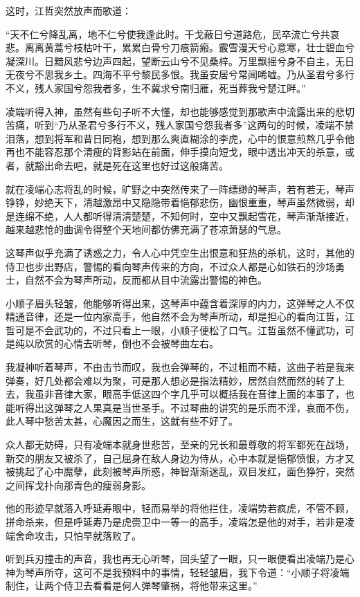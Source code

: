 这时，江哲突然放声而歌道：

“天不仁兮降乱离，地不仁兮使我逢此时。干戈蔽日兮道路危，民卒流亡兮共哀悲。离离黄蒿兮枝枯叶干，累累白骨兮刀痕箭瘢。霰雪漫天兮心意寒，壮士碧血兮凝深川。日黯风悲兮边声四起，望断云山兮不见桑梓。万里飘摇兮身不自主，无日无夜兮不思我乡土。四海不平兮黎民多恨。我虽安居兮常闻唏嘘。乃从圣君兮多行不义，残人家国兮怨我者多，生不冀求兮南归雁，死当葬我兮楚江畔。”

凌端听得入神，虽然有些句子听不大懂，却也能够感觉到那歌声中流露出来的悲切苦痛，听到“乃从圣君兮多行不义，残人家国兮怨我者多”这两句的时候，凌端不禁泪落，想到将军和昔日同袍，想到那么爽直糊涂的李虎，心中的恨意煎熬几乎令他再也不能容忍那个清瘦的背影站在前面，伸手摸向短戈，眼中透出冲天的杀意，或者，就豁出命去吧，就是死在这里也好过这般痛苦。

就在凌端心志将乱的时候，旷野之中突然传来了一阵缥缈的琴声，若有若无，琴声铮铮，妙绝天下，清越激昂中又隐隐带着悒郁悲伤，幽恨重重，琴声虽然微弱，却是连绵不绝，人人都听得清清楚楚，不知何时，空中又飘起雪花，琴声渐渐接近，越来越悲怆的曲调令得整个天地间都仿佛充满了苍凉萧瑟的气息。

这琴声似乎充满了诱惑之力，令人心中凭空生出恨意和狂热的杀机，这时，其他的侍卫也步出野店，警惕的看向琴声传来的方向，不过众人都是心如铁石的沙场勇士，自然不会为琴声所动，反而都从目中流露出警惕的神色。

小顺子眉头轻皱，他能够听得出来，这琴声中蕴含着深厚的内力，这弹琴之人不仅精通音律，还是一位内家高手，他自然不会为琴声所动，却是担心的看向江哲，江哲可是不会武功的，不过只看上一眼，小顺子便松了口气。江哲虽然不懂武功，可是纯以欣赏的心情去听琴，倒也不会被琴曲左右。

我凝神听着琴声，不由击节而叹，我也会弹琴的，不过粗而不精，这曲子若是我来弹奏，好几处都会难以为聚，可是那人想必是指法精妙，居然自然而然的转了上去，我虽非音律大家，眼高手低这四个字几乎可以概括我在音律上面的本事了，也能听得出这弹琴之人果真是当世圣手。不过琴曲的讲究的是乐而不淫，哀而不伤，此人琴中愁苦太甚，心魔因之而生，这就有些不好了。

众人都无妨碍，只有凌端本就身世悲苦，至亲的兄长和最尊敬的将军都死在战场，新交的朋友又被杀了，自己屈身在敌人身边为侍从，心中本就是悒郁愤恨，方才又被挑起了心中魔孽，此刻被琴声所惑，神智渐渐迷乱，双目发红，面色狰狞，突然之间挥戈扑向那青色的瘦弱身影。

他的形迹早就落入呼延寿眼中，轻而易举的将他拦住，凌端势若疯虎，不管不顾，拼命杀来，但是呼延寿乃是虎赍卫中一等一的高手，凌端怎是他的对手，若非是凌端舍命攻击，只怕早就落败了。

听到兵刃撞击的声音，我也再无心听琴，回头望了一眼，只一眼便看出凌端乃是心神为琴声所夺，这可不是我预料中的事情，轻轻皱眉，我下令道：“小顺子将凌端制住，让两个侍卫去看看是何人弹琴肇祸，将他带来这里。”

